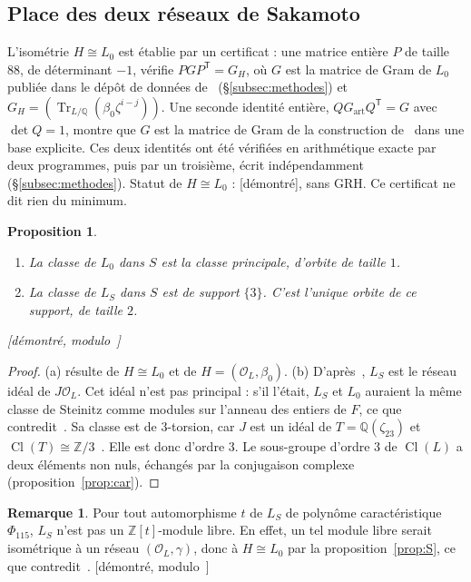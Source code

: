 \documentclass[11pt,a4paper]{amsart}
\theoremstyle{plain}
\newtheorem{proposition}[theoreme]{Proposition}
\theoremstyle{definition}
\newtheorem{remarque}[theoreme]{Remarque}
\numberwithin{equation}{section}
\newcommand{\Q}{\mathbb{Q}}
\newcommand{\Z}{\mathbb{Z}}
\newcommand{\OO}{\mathcal{O}}
\DeclareMathOperator{\Tr}{Tr}
\DeclareMathOperator{\Cl}{Cl}
\newcommand{\Lz}{L_{0}}
\newcommand{\LS}{L_{S}}
\newcommand{\st}[1]{\textup{\textsf{\small[#1]}}}
\newcommand{\DEM}{\st{démontré}}
\begin{document}
\subsection{Place des deux réseaux de Sakamoto}\label{subsec:sakamoto}

L'isométrie $H\cong\Lz$ est établie par un certificat : une matrice entière $P$ de taille $88$, de déterminant $-1$, vérifie $PGP^{\mathsf T}=G_H$, où $G$ est la matrice de Gram de $\Lz$ publiée dans le dépôt de données de~\cite{Sak26} (\S\ref{subsec:methodes}) et $G_H=(\Tr_{L/\Q}(\beta_0\zeta^{i-j}))$. Une seconde identité entière, $QG_{\mathrm{art}}Q^{\mathsf T}=G$ avec $\det Q=1$, montre que $G$ est la matrice de Gram de la construction de~\cite[\S5.4]{Sak26} dans une base explicite. Ces deux identités ont été vérifiées en arithmétique exacte par deux programmes, puis par un troisième, écrit indépendamment (\S\ref{subsec:methodes}). Statut de $H\cong\Lz$ : \DEM, sans GRH. Ce certificat ne dit rien du minimum.

\begin{proposition}\label{prop:L0LS}
\begin{enumerate}[label=\textup{(\alph*)}]
\item La classe de $\Lz$ dans $S$ est la classe principale, d'orbite de taille $1$.
\item La classe de $\LS$ dans $S$ est de support $\{3\}$. C'est l'unique orbite de ce support, de taille $2$.
\end{enumerate}
\st{démontré, modulo~\cite[rem.~3.11 et lemme~A.9]{Sak26}}
\end{proposition}

\begin{proof}
(a) résulte de $H\cong\Lz$ et de $H=(\OO_L,\beta_0)$.
(b) D'après~\cite[rem.~3.11]{Sak26}, $\LS$ est le réseau idéal de $J\OO_L$. Cet idéal n'est pas principal : s'il l'était, $\LS$ et $\Lz$ auraient la même classe de Steinitz comme modules sur l'anneau des entiers de $F$, ce que contredit~\cite[lemme~A.9]{Sak26}. Sa classe est de $3$-torsion, car $J$ est un idéal de $T=\Q(\zeta_{23})$ et $\Cl(T)\cong\Z/3$~\cite{Sak26}. Elle est donc d'ordre $3$. Le sous-groupe d'ordre $3$ de $\Cl(L)$ a deux éléments non nuls, échangés par la conjugaison complexe (proposition~\ref{prop:car}).
\end{proof}

\begin{remarque}\label{rem:nonlibre}
Pour tout automorphisme $t$ de $\LS$ de polynôme caractéristique $\Phi_{115}$, $\LS$ n'est pas un $\Z[t]$-module libre. En effet, un tel module libre serait isométrique à un réseau $(\OO_L,\gamma)$, donc à $H\cong\Lz$ par la proposition~\ref{prop:S}, ce que contredit~\cite[th.~A.10]{Sak26}. \st{démontré, modulo~\cite[th.~A.10]{Sak26}}
\end{remarque}
\end{document}
